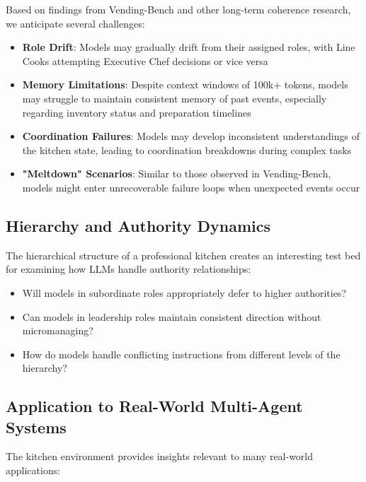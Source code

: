 \documentclass{article}
\begin{document}
Based on findings from Vending-Bench \cite{backlund2025vending} and other long-term coherence research, we anticipate several challenges:

\begin{itemize}
    \item \textbf{Role Drift}: Models may gradually drift from their assigned roles, with Line Cooks attempting Executive Chef decisions or vice versa
    
    \item \textbf{Memory Limitations}: Despite context windows of 100k+ tokens, models may struggle to maintain consistent memory of past events, especially regarding inventory status and preparation timelines
    
    \item \textbf{Coordination Failures}: Models may develop inconsistent understandings of the kitchen state, leading to coordination breakdowns during complex tasks
    
    \item \textbf{"Meltdown" Scenarios}: Similar to those observed in Vending-Bench, models might enter unrecoverable failure loops when unexpected events occur
\end{itemize}

\subsection{Hierarchy and Authority Dynamics}

The hierarchical structure of a professional kitchen creates an interesting test bed for examining how LLMs handle authority relationships:

\begin{itemize}
    \item Will models in subordinate roles appropriately defer to higher authorities?
    \item Can models in leadership roles maintain consistent direction without micromanaging?
    \item How do models handle conflicting instructions from different levels of the hierarchy?
\end{itemize}

\subsection{Application to Real-World Multi-Agent Systems}

The kitchen environment provides insights relevant to many real-world applications:
\end{document}
